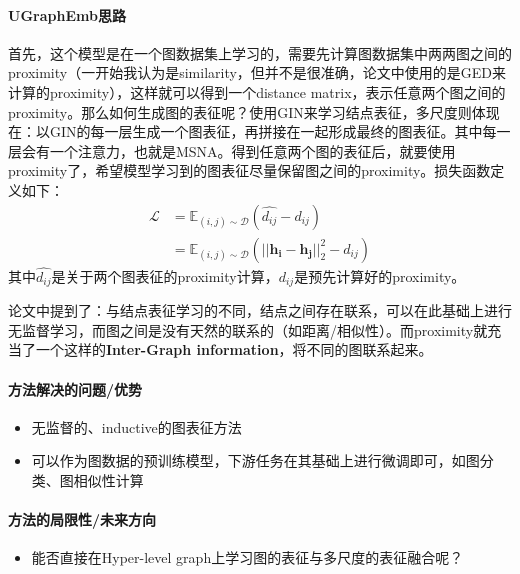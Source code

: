 \paragraph{UGraphEmb思路}首先，这个模型是在一个图数据集上学习的，需要先计算图数据集中两两图之间的proximity（一开始我认为是similarity，但并不是很准确，论文中使用的是GED来计算的proximity），这样就可以得到一个distance matrix，表示任意两个图之间的proximity。那么如何生成图的表征呢？使用GIN\cite{xu2018how}来学习结点表征，多尺度则体现在：以GIN的每一层生成一个图表征，再拼接在一起形成最终的图表征。其中每一层会有一个注意力，也就是MSNA。得到任意两个图的表征后，就要使用proximity了，希望模型学习到的图表征尽量保留图之间的proximity。损失函数定义如下：
\begin{equation}\nonumber
	\begin{aligned}
		\mathcal{L} &= \mathbb{E}_{(i, j) \sim \mathcal{D}} (\hat{d_{ij} } - d_{ij} )\\
		&= \mathbb{E}_{(i, j) \sim \mathcal{D}} (||\boldsymbol{h_i} - \boldsymbol{h_j} ||_2^2 - d_{ij} )
	\end{aligned}
\end{equation}
其中$\hat{d_{ij} }$是关于两个图表征的proximity计算，$d_{ij}$是预先计算好的proximity。

论文中提到了：与结点表征学习的不同，结点之间存在联系，可以在此基础上进行无监督学习，而图之间是没有天然的联系的（如距离/相似性）。而proximity就充当了一个这样的\textbf{Inter-Graph information}，将不同的图联系起来。

\paragraph{方法解决的问题/优势}
\begin{itemize}
	\item 无监督的、inductive的图表征方法
	\item 可以作为图数据的预训练模型，下游任务在其基础上进行微调即可，如图分类、图相似性计算
\end{itemize}

\paragraph{方法的局限性/未来方向}
\begin{itemize}
	\item 能否直接在Hyper-level graph上学习图的表征与多尺度的表征融合呢？
\end{itemize}


